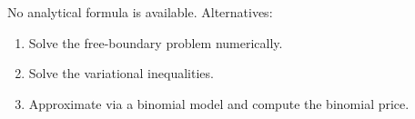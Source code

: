 \begin{remark}
    No analytical formula is available. Alternatives:
    \begin{enumerate}
        \item Solve the free-boundary problem numerically.
        \item Solve the variational inequalities.
        \item Approximate via a binomial model and compute the binomial price.
    \end{enumerate}
\end{remark}